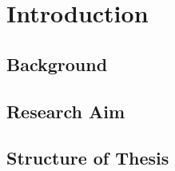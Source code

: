\chapter{Introduction}
\section{Background}


\section{Research Aim}




\section{Structure of Thesis}
